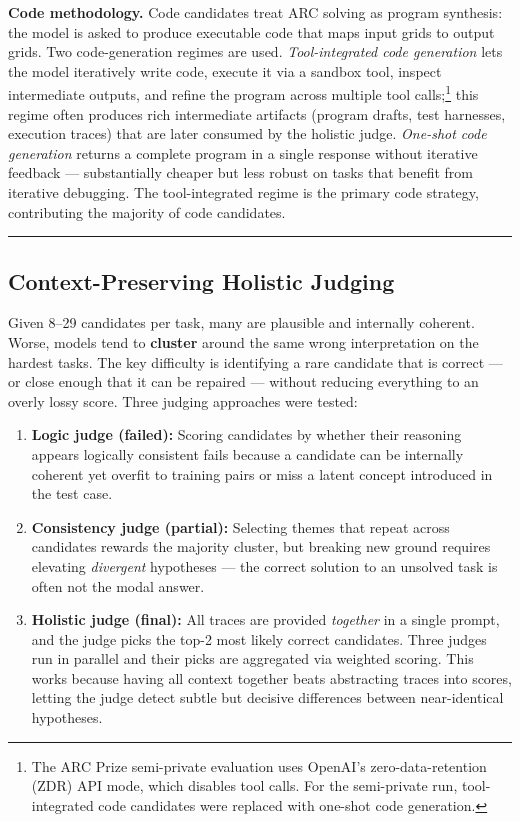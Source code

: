 \documentclass[conference]{IEEEtran}
\providecommand{\tightlist}{%
  \setlength{\itemsep}{0pt}\setlength{\parskip}{0pt}}
\begin{document}
\textbf{Code methodology.} Code candidates treat ARC solving as program
synthesis: the model is asked to produce executable code that maps input
grids to output grids. Two code-generation regimes are used.
\emph{Tool-integrated code generation} lets the model iteratively write
code, execute it via a sandbox tool, inspect intermediate outputs, and
refine the program across multiple tool calls;\footnote{The ARC Prize
  semi-private evaluation uses OpenAI's zero-data-retention (ZDR) API
  mode, which disables tool calls. For the semi-private run,
  tool-integrated code candidates were replaced with one-shot code
  generation.} this regime often produces rich intermediate artifacts
(program drafts, test harnesses, execution traces) that are later
consumed by the holistic judge. \emph{One-shot code generation} returns
a complete program in a single response without iterative feedback ---
substantially cheaper but less robust on tasks that benefit from
iterative debugging. The tool-integrated regime is the primary code
strategy, contributing the majority of code candidates.

\begin{center}\rule{0.5\linewidth}{0.5pt}\end{center}

\subsection{Context-Preserving Holistic
Judging}\label{context-preserving-holistic-judging}

Given 8--29 candidates per task, many are plausible and internally
coherent. Worse, models tend to \textbf{cluster} around the same wrong
interpretation on the hardest tasks. The key difficulty is identifying a
rare candidate that is correct --- or close enough that it can be
repaired --- without reducing everything to an overly lossy score. Three
judging approaches were tested:

\begin{enumerate}
\def\labelenumi{\arabic{enumi}.}
\tightlist
\item
  \textbf{Logic judge (failed):} Scoring candidates by whether their
  reasoning appears logically consistent fails because a candidate can
  be internally coherent yet overfit to training pairs or miss a latent
  concept introduced in the test case.
\item
  \textbf{Consistency judge (partial):} Selecting themes that repeat
  across candidates rewards the majority cluster, but breaking new
  ground requires elevating \emph{divergent} hypotheses --- the correct
  solution to an unsolved task is often not the modal answer.
\item
  \textbf{Holistic judge (final):} All traces are provided
  \emph{together} in a single prompt, and the judge picks the top-2 most
  likely correct candidates. Three judges run in parallel and their
  picks are aggregated via weighted scoring. This works because having
  all context together beats abstracting traces into scores, letting the
  judge detect subtle but decisive differences between near-identical
  hypotheses.
\end{enumerate}
\end{document}
